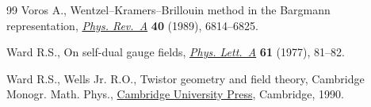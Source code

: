 \documentclass[pdftex]{sigma}
\numberwithin{equation}{section}
\begin{document}
\begin{thebibliography}{99}
Voros A., Wentzel--{K}ramers--{B}rillouin method in the {B}argmann
 representation, \href{https://doi.org/10.1103/PhysRevA.40.6814}{\textit{Phys.
 Rev.~A}} \textbf{40} (1989), 6814--6825.

Ward R.S., On self-dual gauge fields,
 \href{https://doi.org/10.1016/0375-9601(77)90842-8}{\textit{Phys. Lett.~A}}
 \textbf{61} (1977), 81--82.

Ward R.S., Wells Jr. R.O., Twistor geometry and field theory, Cambridge Monogr.
 Math. Phys., \href{https://doi.org/10.1017/CBO9780511524493}{Cambridge
 University Press}, Cambridge, 1990.

\end{thebibliography}\LastPageEnding
\end{document}
